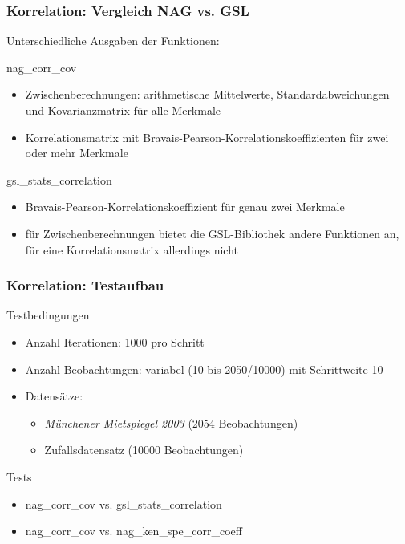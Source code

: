 \documentclass{beamer}
\begin{document}
\begin{frame}
	\frametitle{Korrelation: Vergleich NAG vs. GSL}
	
	Unterschiedliche Ausgaben der Funktionen:

	\begin{block}{nag\_corr\_cov}
		\begin{itemize}
			\item Zwischenberechnungen: arithmetische Mittelwerte, Standardabweichungen und Kovarianzmatrix für alle Merkmale
			\item Korrelationsmatrix mit Bravais-Pearson-Korrelationskoeffizienten für zwei oder mehr Merkmale
		\end{itemize}
	\end{block}
	
	\begin{block}{gsl\_stats\_correlation}
		\begin{itemize}
			\item Bravais-Pearson-Korrelationskoeffizient für genau zwei Merkmale
		\end{itemize}
	\end{block}
	
	\begin{itemize}
			\item für Zwischenberechnungen bietet die GSL-Bibliothek andere Funktionen an, für eine Korrelationsmatrix allerdings nicht
		\end{itemize}
\end{frame}

\begin{frame}
	\frametitle{Korrelation: Testaufbau}
	
	\begin{block}{Testbedingungen}
		\begin{itemize}
			\item Anzahl Iterationen: 1000 pro Schritt
			\item Anzahl Beobachtungen: variabel (10 bis 2050/10000) mit Schrittweite 10
			\item Datensätze:
			\begin{itemize}
				\item {\it Münchener Mietspiegel 2003} (2054 Beobachtungen)
				\item Zufallsdatensatz (10000 Beobachtungen)
			\end{itemize}
		\end{itemize}
	\end{block}
	
	\begin{block}{Tests}
		\begin{itemize}
			\item nag\_corr\_cov vs. gsl\_stats\_correlation
			\item nag\_corr\_cov vs. nag\_ken\_spe\_corr\_coeff
		\end{itemize}
	\end{block}
\end{frame}
\end{document}
